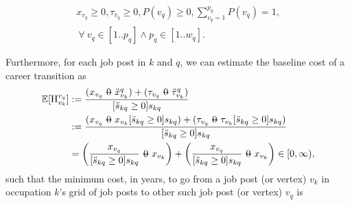\documentclass[12pt, a4paper]{article}
\makeatletter
\newcommand{\superimpose}[2]{{
  \ooalign{
    \hfil$\m@th#1\@firstoftwo#2$\hfil\cr
    \hfil$\m@th#1\@secondoftwo#2$\hfil\cr
  }
}}
\newcommand{\stack}[2]{\mathbin{\mathpalette\superimpose{{#1}{#2}}}}
\newcommand{\minuszero}{\stack{0}{-}}
\newcommand{\Eta}{\text{H}}
\makeatother
\begin{document}
\begin{gather}
  x_{v_q} \geq 0
  ,
  \tau_{v_q} \geq 0
  ,
  P(v_q) \geq 0
  ,
  \sum_{v_q=1}^{p_q} P(v_q) = 1
  , \\
  \
  \forall
  \
  v_q \in [1..p_q] \land p_q \in [1..w_q]
  .
\end{gather}

Furthermore, for each job post in $k$ and $q$, we can estimate the baseline
cost of a career transition as
\begin{align}
  \mathbb{E}[\Eta_{v_k}^{v_q}]
   & :=
  \frac{
    (x_{v_q} \minuszero \ddot{x}_{v_k}^{q})
    +
    (\tau_{v_q} \minuszero \ddot{\tau}_{v_k}^{q})
  }{
    [\ddot{s}_{kq} \geq 0] s_{kq}
  }
  \\
   & :=
  \frac{
    (x_{v_q} \minuszero x_{v_k} [\ddot{s}_{kq} \geq 0] s_{kq})
    +
    (\tau_{v_q} \minuszero \tau_{v_k} [\ddot{s}_{kq} \geq 0] s_{kq})
  }{
    [\ddot{s}_{kq} \geq 0] s_{kq}
  }
  \\
   & =
  \left(
  \frac{x_{v_q}}{[\ddot{s}_{kq} \geq 0] s_{kq}}
  \minuszero
  x_{v_k}
  \right)
  +
  \left(
  \frac{x_{v_q}}{[\ddot{s}_{kq} \geq 0] s_{kq}}
  \minuszero
  x_{v_k}
  \right)
  \in
  [0, \infty)
  ,
\end{align}
such that the minimum cost, in years, to go from a job post (or vertex) $v_k$
in occupation $k$'s grid of job posts to other such job post (or vertex) $v_q$
is
\end{document}
